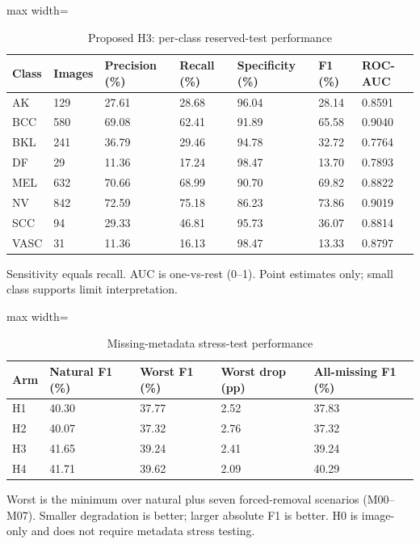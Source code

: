 \begin{table}[t]
\centering
\small
\caption{Proposed H3: per-class reserved-test performance}
\label{tab:07-h3-per-class}
\begin{adjustbox}{max width=\textwidth}
\begin{tabular}{lllllll}
\toprule
\textbf{Class} & \textbf{Images} & \textbf{Precision (\%)} & \textbf{Recall (\%)} & \textbf{Specificity (\%)} & \textbf{F1 (\%)} & \textbf{ROC-AUC} \\
\midrule
AK & 129 & 27.61 & 28.68 & 96.04 & 28.14 & 0.8591 \\
BCC & 580 & 69.08 & 62.41 & 91.89 & 65.58 & 0.9040 \\
BKL & 241 & 36.79 & 29.46 & 94.78 & 32.72 & 0.7764 \\
DF & 29 & 11.36 & 17.24 & 98.47 & 13.70 & 0.7893 \\
MEL & 632 & 70.66 & 68.99 & 90.70 & 69.82 & 0.8822 \\
NV & 842 & 72.59 & 75.18 & 86.23 & 73.86 & 0.9019 \\
SCC & 94 & 29.33 & 46.81 & 95.73 & 36.07 & 0.8814 \\
VASC & 31 & 11.36 & 16.13 & 98.47 & 13.33 & 0.8797 \\
\bottomrule
\end{tabular}
\end{adjustbox}
\par\smallskip
\begin{minipage}{\textwidth}\footnotesize Sensitivity equals recall. AUC is one-vs-rest (0--1). Point estimates only; small class supports limit interpretation.\end{minipage}
\end{table}

\begin{table}[t]
\centering
\small
\caption{Missing-metadata stress-test performance}
\label{tab:08-metadata-robustness}
\begin{adjustbox}{max width=\textwidth}
\begin{tabular}{lllll}
\toprule
\textbf{Arm} & \textbf{Natural F1 (\%)} & \textbf{Worst F1 (\%)} & \textbf{Worst drop (pp)} & \textbf{All-missing F1 (\%)} \\
\midrule
H1 & 40.30 & 37.77 & 2.52 & 37.83 \\
H2 & 40.07 & 37.32 & 2.76 & 37.32 \\
H3 & 41.65 & 39.24 & 2.41 & 39.24 \\
H4 & 41.71 & 39.62 & 2.09 & 40.29 \\
\bottomrule
\end{tabular}
\end{adjustbox}
\par\smallskip
\begin{minipage}{\textwidth}\footnotesize Worst is the minimum over natural plus seven forced-removal scenarios (M00--M07). Smaller degradation is better; larger absolute F1 is better. H0 is image-only and does not require metadata stress testing.\end{minipage}
\end{table}

